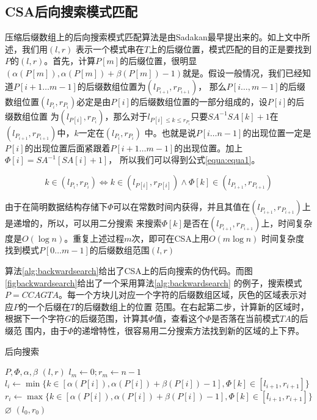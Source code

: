 \subsection{CSA后向搜索模式匹配}
压缩后缀数组上的后向搜索模式匹配算法是由Sadakan最早提出来的\cite{sadakane2002succinct}。如上文中所述，我们用$(l,r)$
表示一个模式串在$T$上的后缀位置，模式匹配的目的正是要找到$P$的$(l,r)$。首先，计算$P[m]$的后缀位置，很明显$(\alpha(P[m]),
\alpha(P[m])+\beta(P[m])-1)$就是。假设一般情况，我们已经知道$P[i+1\ldots m-1]$的后缀数组位置为$(l_{P_{i+1}},r_{P_{i+1}})$，
那么$P[i\ldots,m-1]$的后缀数组位置$(l_{P_i},r_{P_i})$必定是由$P[i]$的后缀数组位置的一部分组成的，设$P[i]$的后缀数组位置
为$(l_{P[i]},r_{P_i})$，那么对于$l_{P[i]\leq k \leq r_{P_i}}$只要$SA^{-1}SA[k]+1$在$(l_{P_{i+1}},r_{P_{i+1}})$中，$k$一定在$(l_{P_i},r_{P_i})$
中。也就是说$P[i\ldots n-1]$的出现位置一定是$P[i]$的出现位置后面紧跟着$P[i+1\ldots m-1]$的出现位置。加上$\Phi[i]=SA^{-1}[SA[i]+1]$，
所以我们可以得到公式\ref{equa:equa1}。

\begin{equation}\label{equa:equa1}
    k \in (l_{P_i},r_{P_i}) \iff k \in (l_{P[i]},r_{P[i]}) \wedge \Phi[k] \in (l_{P_{i+1}},r_{P_{i+1}})
\end{equation}

由于在简明数据结构存储下$\Phi$可以在常数时间内获得，并且其值在$(l_{P_{i+1}},r_{P_{i+1}})$上是递增的，所以，可以用二分搜索
来搜索$\Phi[k]$是否在$(l_{P_{i+1}},r_{P_{i+1}})$上，时间复杂度是$O(\log n)$。重复上述过程$m$次，即可在CSA上用$O(m\log n)$
时间复杂度找到模式$P[0\ldots m-1]$的后缀数组范围$(l,r)$

算法\ref{alg:backwardsearch}给出了CSA上的后向搜索的伪代码。而图\ref{figbackwardsearch}给出了一个采用算法\ref{alg:backwardsearch}
的例子，搜索模式$P=CCAGTA$。每一个方块儿对应一个字符的后缀数组区域，灰色的区域表示对应$P$的一个后缀在$T$的后缀数组上的位置
范围。在右起第二步，计算新的区域时，根据下一个字符$G$的后缀范围，计算其$\Phi$值，查看这个$\Phi$是否落在当前模式$TA$的后缀范
围内，由于$\Phi$的递增特性，很容易用二分搜索方法找到新的区域的上下界。

\begin{algorithm}
    \caption{后向搜索}
    \label{alg:backwardsearch}
    \begin{algorithmic}[1]
        \Require $P,\Phi,\alpha,\beta$
        \Ensure $(l,r)$
        \State $l_{m} \gets 0;r_{m}\gets n-1$
            \State $l_i \gets \min\{ k \in [\alpha(P[i]),\alpha(P[i])+\beta(P[i])-1],\Phi[k] \in [l_{i+1},r_{i+1}]\}$
            \State $r_i \gets \max\{ k \in [\alpha(P[i]),\alpha(P[i])+\beta(P[i])-1],\Phi[k] \in [l_{i+1},r_{i+1}]\}$
                \State \Return $\varnothing$
            \EndIf
        \EndFor
        \State \Return $(l_0,r_0)$
        \EndFunction
    \end{algorithmic}
\end{algorithm}


